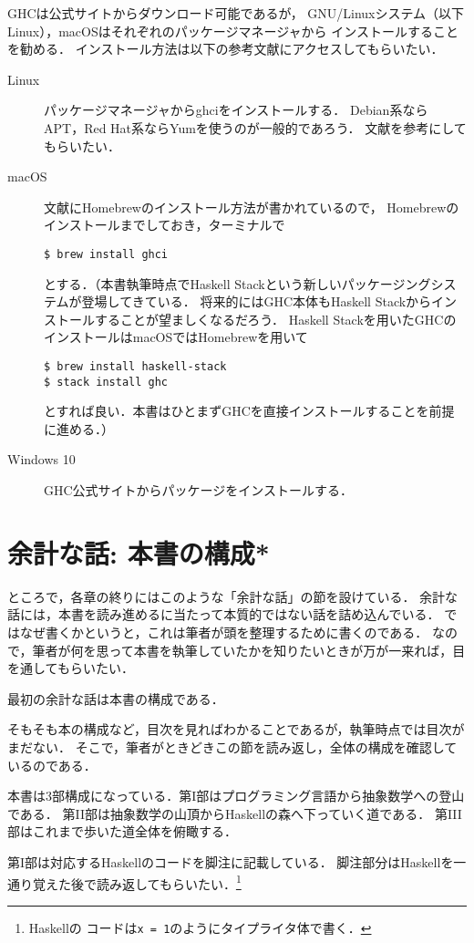 \documentclass[a5paper,draft]{jsbook}
\newcommand{\programminglanguage}[1]{\textsf{#1}}
\newcommand{\haskell}{\programminglanguage{Haskell}}
\newcommand{\code}[1]{\texttt{#1}}
\begin{document}
GHCは公式サイト\cite{haskellplatform}からダウンロード可能であるが，
GNU/Linuxシステム（以下Linux），macOSはそれぞれのパッケージマネージャから
インストールすることを勧める．
インストール方法は以下の参考文献にアクセスしてもらいたい．
\begin{description}
\item[Linux] パッケージマネージャからghciをインストールする．
Debian系ならAPT，Red Hat系ならYumを使うのが一般的であろう．
文献\cite{linux}を参考にしてもらいたい．
\item[macOS] 文献\cite{osx}にHomebrewのインストール方法が書かれているので，
Homebrewのインストールまでしておき，ターミナルで
\begin{verbatim}
$ brew install ghci
\end{verbatim}
とする．（本書執筆時点でHaskell Stackという新しいパッケージングシステムが登場してきている．
将来的にはGHC本体もHaskell Stackからインストールすることが望ましくなるだろう．
Haskell Stackを用いたGHCのインストールはmacOSではHomebrewを用いて
\begin{verbatim}
$ brew install haskell-stack
$ stack install ghc
\end{verbatim}
とすれば良い．本書はひとまずGHCを直接インストールすることを前提に進める．）
\item[Windows 10] GHC公式サイト\cite{haskellplatform}からパッケージをインストールする．
\end{description}

\section{余計な話: 本書の構成*}

ところで，各章の終りにはこのような「余計な話」の節を設けている．
余計な話には，本書を読み進めるに当たって本質的ではない話を詰め込んでいる．
ではなぜ書くかというと，これは筆者が頭を整理するために書くのである．
なので，筆者が何を思って本書を執筆していたかを知りたいときが万が一来れば，目を通してもらいたい．

最初の余計な話は本書の構成である．

そもそも本の構成など，目次を見ればわかることであるが，執筆時点では目次がまだない．
そこで，筆者がときどきこの節を読み返し，全体の構成を確認しているのである．

本書は3部構成になっている．第I部はプログラミング言語から抽象数学への登山である．
第II部は抽象数学の山頂から\haskell の森へ下っていく道である．
第III部はこれまで歩いた道全体を俯瞰する．

第I部は対応する\haskell のコードを脚注に記載している．
脚注部分は\haskell を一通り覚えた後で読み返してもらいたい．\footnote{\haskell の
コードは\code{x = 1}のようにタイプライタ体で書く．}
\end{document}
